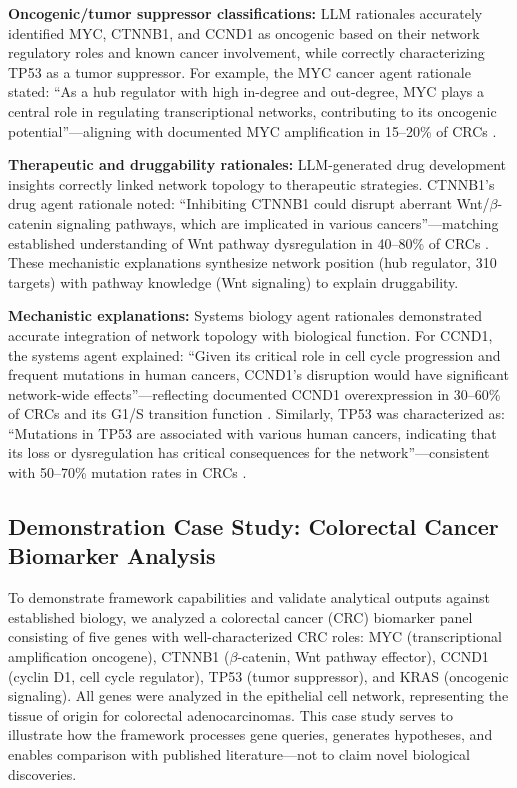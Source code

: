 \documentclass[11pt]{article}
\begin{document}
\textbf{Oncogenic/tumor suppressor classifications:} LLM rationales accurately identified MYC, CTNNB1, and CCND1 as oncogenic based on their network regulatory roles and known cancer involvement, while correctly characterizing TP53 as a tumor suppressor. For example, the MYC cancer agent rationale stated: ``As a hub regulator with high in-degree and out-degree, MYC plays a central role in regulating transcriptional networks, contributing to its oncogenic potential''---aligning with documented MYC amplification in 15--20\% of CRCs \cite{myc1985,myc2000}.

\textbf{Therapeutic and druggability rationales:} LLM-generated drug development insights correctly linked network topology to therapeutic strategies. CTNNB1's drug agent rationale noted: ``Inhibiting CTNNB1 could disrupt aberrant Wnt/$\beta$-catenin signaling pathways, which are implicated in various cancers''---matching established understanding of Wnt pathway dysregulation in 40--80\% of CRCs \cite{ctnnb11997,ctnnb12006}. These mechanistic explanations synthesize network position (hub regulator, 310 targets) with pathway knowledge (Wnt signaling) to explain druggability.

\textbf{Mechanistic explanations:} Systems biology agent rationales demonstrated accurate integration of network topology with biological function. For CCND1, the systems agent explained: ``Given its critical role in cell cycle progression and frequent mutations in human cancers, CCND1's disruption would have significant network-wide effects''---reflecting documented CCND1 overexpression in 30--60\% of CRCs and its G1/S transition function \cite{ccnd11995}. Similarly, TP53 was characterized as: ``Mutations in TP53 are associated with various human cancers, indicating that its loss or dysregulation has critical consequences for the network''---consistent with 50--70\% mutation rates in CRCs \cite{tp53_2003,tp53_2010}.

\subsection{Demonstration Case Study: Colorectal Cancer Biomarker Analysis}

To demonstrate framework capabilities and validate analytical outputs against established biology, we analyzed a colorectal cancer (CRC) biomarker panel consisting of five genes with well-characterized CRC roles: MYC (transcriptional amplification oncogene), CTNNB1 ($\beta$-catenin, Wnt pathway effector), CCND1 (cyclin D1, cell cycle regulator), TP53 (tumor suppressor), and KRAS (oncogenic signaling). All genes were analyzed in the epithelial cell network, representing the tissue of origin for colorectal adenocarcinomas. This case study serves to illustrate how the framework processes gene queries, generates hypotheses, and enables comparison with published literature---not to claim novel biological discoveries.
\end{document}
